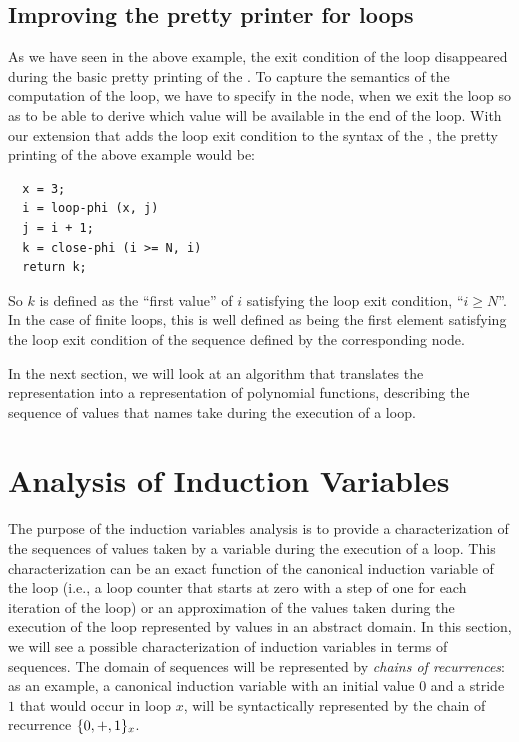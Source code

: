 \subsection{Improving the \SSA{} pretty printer for loops}

As we have seen in the above example, the exit condition of the loop
disappeared during the basic pretty printing of the \SSA{}.  To capture
the semantics of the computation of the loop, we have to specify in
the \closephi{} node, when we exit the loop so as to be able to derive which value will be available in the end of the
loop. With our
extension that adds the loop exit condition to the syntax of the \closephi{}, the \SSA{} pretty printing of the above example would be:
\begin{verbatim}
  x = 3;
  i = loop-phi (x, j)
  j = i + 1;
  k = close-phi (i >= N, i)
  return k;
\end{verbatim}
So $k$ is defined as the ``first value'' of $i$ satisfying the loop
exit condition, ``$i \geq N$''.  In the case of finite loops, this is well defined as being the first element satisfying the loop exit condition of the sequence defined by the corresponding \loopphi{} node.

In the next section, we will look at an algorithm that translates the
\SSA{} representation into a representation of polynomial functions,
describing the sequence of values that \SSA{} names take during the
execution of a loop.

\section{Analysis of Induction Variables}

The purpose of the induction variables analysis is to provide a
characterization of the sequences of values taken by a variable during
the execution of a loop.  This characterization can be an exact
function of the canonical induction variable of the loop (i.e., a loop counter that starts at zero with a step of one for
each iteration of the loop) or an approximation of the values taken
during the execution of the loop represented by values in an abstract
domain.  In this section, we will see a possible characterization of
induction variables in terms of sequences.  The domain of sequences
will be represented by {\em chains of recurrences}: as an example, a
canonical induction variable with an initial value $0$ and a stride
$1$ that would occur in loop $x$, will be syntactically represented by
the chain of recurrence $\{0, +, 1\}_x$.

